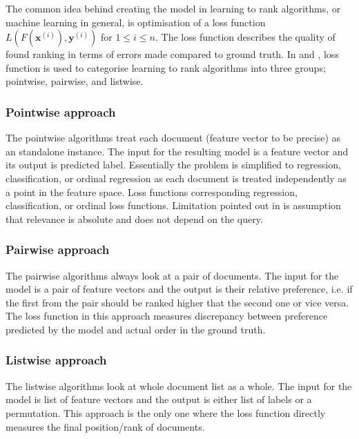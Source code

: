 The common idea behind creating the model in learning to rank algorithms, or machine learning in general, is optimisation of a loss function $L(F(\mathbf{x}^{(i)}), \mathbf{y}^{(i)})$ for $1 \le i \le n$. The loss function describes the quality of found ranking in terms of errors made compared to ground truth. In \cite{LTR4IR} and \cite{li}, loss function is used to categorise learning to rank algorithms into three groups; pointwise, pairwise, and listwise.

\subsubsection{Pointwise approach}
The pointwise algorithms treat each document (feature vector to be precise) as an standalone instance. The input for the resulting model is a feature vector and its output is predicted label. Essentially the problem is simplified to regression, classification, or  ordinal regression as each document is treated independently as a point in the feature space. Loss functions corresponding regression, classification, or ordinal loss functions. Limitation pointed out in \cite{LTR4IR} is assumption that relevance is absolute and does not depend on the query.

\subsubsection{Pairwise approach}
The pairwise algorithms always look at a pair of documents. The input for the model is a pair of feature vectors and the output is their relative preference, i.e. if the first from the pair should be ranked higher that the second one or vice versa. The loss function in this approach measures discrepancy between preference predicted by the model and actual order in the ground truth.

\subsubsection{Listwise approach}
The listwise algorithms look at whole document list as a whole. The input for the model is list of feature vectors and the output is either list of labels or a permutation. This approach is the only one where the loss function directly measures the final position/rank of documents.

